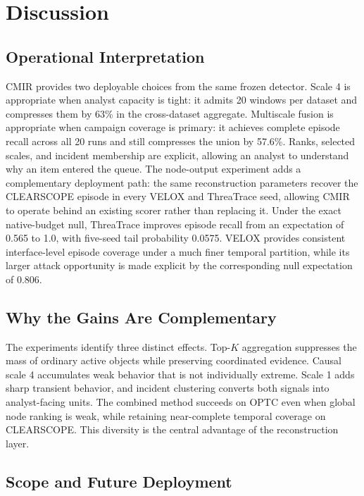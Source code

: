 \documentclass[lettersize,journal]{IEEEtran}
\newcommand{\method}{CMIR}
\begin{document}
\section{Discussion}
\label{sec:discussion}

\subsection{Operational Interpretation}

\method{} provides two deployable choices from the same frozen detector.
Scale 4 is appropriate when analyst capacity is tight: it admits 20 windows per
dataset and compresses them by 63\% in the cross-dataset aggregate.  Multiscale
fusion is appropriate when campaign coverage is primary: it achieves complete
episode recall across all 20 runs and still compresses the union by 57.6\%.
Ranks, selected scales, and incident membership are explicit, allowing an
analyst to understand why an item entered the queue.
The node-output experiment adds a complementary deployment path: the same
reconstruction parameters recover the CLEARSCOPE episode in every VELOX and
ThreaTrace seed, allowing \method{} to operate behind an existing scorer rather
than replacing it.  Under the exact native-budget null, ThreaTrace improves
episode recall from an expectation of 0.565 to 1.0, with five-seed tail
probability 0.0575.  VELOX provides consistent interface-level episode coverage
under a much finer temporal partition, while its larger attack opportunity is
made explicit by the corresponding null expectation of 0.806.

\subsection{Why the Gains Are Complementary}

The experiments identify three distinct effects.  Top-$K$ aggregation suppresses
the mass of ordinary active objects while preserving coordinated evidence.
Causal scale 4 accumulates weak behavior that is not individually extreme.
Scale 1 adds sharp transient behavior, and incident clustering converts both
signals into analyst-facing units.  The combined method succeeds on OPTC even
when global node ranking is weak, while retaining near-complete temporal coverage
on CLEARSCOPE.  This diversity is the central advantage of the reconstruction
layer.

\subsection{Scope and Future Deployment}
\end{document}
